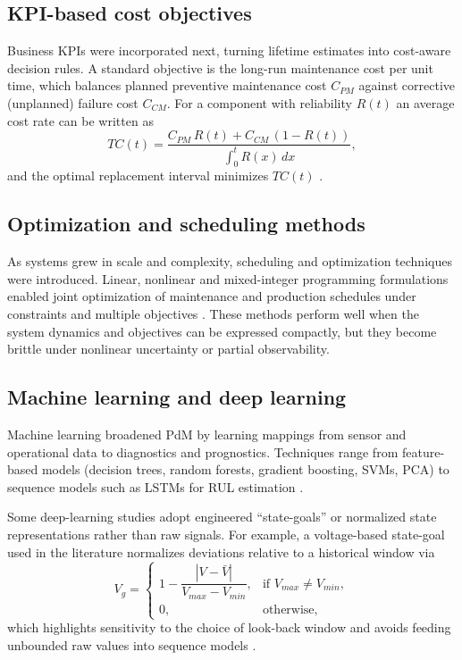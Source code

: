 \documentclass[12pt,oneside]{book}
\begin{document}
\subsection{KPI-based cost objectives}
Business KPIs were incorporated next, turning lifetime estimates into cost-aware decision rules. A standard objective is the long-run maintenance cost per unit time, which balances planned preventive maintenance cost $C_{PM}$ against corrective (unplanned) failure cost $C_{CM}$. For a component with reliability $R(t)$ an average cost rate can be written as
\begin{equation}\label{eq:TC}
	TC(t) = \dfrac{C_{PM}\,R(t) + C_{CM}\,(1-R(t))}{\int_{0}^{t} R(x)\,dx},
\end{equation}
and the optimal replacement interval minimizes $TC(t)$ \citep{mann1995}.

\subsection{Optimization and scheduling methods}
As systems grew in scale and complexity, scheduling and optimization techniques were introduced. Linear, nonlinear and mixed-integer programming formulations enabled joint optimization of maintenance and production schedules under constraints and multiple objectives \citep{russenschuck1999,LiZhaojun2016}. These methods perform well when the system dynamics and objectives can be expressed compactly, but they become brittle under nonlinear uncertainty or partial observability.

\subsection{Machine learning and deep learning}
Machine learning broadened PdM by learning mappings from sensor and operational data to diagnostics and prognostics. Techniques range from feature-based models (decision trees, random forests, gradient boosting, SVMs, PCA) to sequence models such as LSTMs for RUL estimation \citep{eke2017,scheibelhofer2012methodology,Kabir2018,Ren2021,Mattioli2020,Fink2020}.

Some deep-learning studies adopt engineered ``state-goals'' or normalized state representations rather than raw signals. For example, a voltage-based state-goal used in the literature normalizes deviations relative to a historical window via
\begin{equation}\label{eq:voltagestate}
	V_g = \begin{cases}
		1 - \dfrac{|V-\bar{V}|}{V_{max}-V_{min}}, & \text{if } V_{max}\neq V_{min},\\
		0, & \text{otherwise},
	\end{cases}
\end{equation}
which highlights sensitivity to the choice of look-back window and avoids feeding unbounded raw values into sequence models \citep{skydt2021}.
\end{document}
